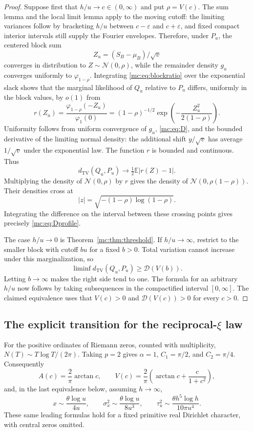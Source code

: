 \begin{proof}
Suppose first that $h/u\to c\in(0,\infty)$ and put $\rho=V(c)$.
The sum lemma and the local limit lemma apply to the moving cutoff:
the limiting variances follow by bracketing $h/u$ between $c-\varepsilon$
and $c+\varepsilon$, and fixed compact interior intervals still supply
the Fourier envelopes.  Therefore, under $P_u$, the centered block sum
\[
 Z_u=(S_B-\mu_B)/\sqrt v
\]
converges in distribution to $Z\sim\mathcal N(0,\rho)$, while the
remainder density $g_u$ converges uniformly to
$\varphi_{1-\rho}$.  Integrating \eqref{mc:eq:blockratio} over the
exponential slack shows that the marginal likelihood of $Q_u$
relative to $P_u$ differs, uniformly in the block values, by $o(1)$
from
\[
 r(Z_u)=\frac{\varphi_{1-\rho}(-Z_u)}{\varphi_1(0)}
       =(1-\rho)^{-1/2}
         \exp\left(-\frac{Z_u^2}{2(1-\rho)}\right).
\]
Uniformity follows from uniform convergence of $g_u$,
\eqref{mc:eq:D}, and the bounded derivative of the limiting normal
density: the additional shift $y/\sqrt v$ has average $1/\sqrt v$
under the exponential law.  The function $r$ is bounded and
continuous.  Thus
\[
 d_{\mathrm{TV}}(Q_u,P_u)
 \longrightarrow\tfrac12\mathbb E|r(Z)-1|.
\]
Multiplying the density of $\mathcal N(0,\rho)$ by $r$ gives the
density of $\mathcal N(0,\rho(1-\rho))$.  Their densities cross at
\[
 |z|=\sqrt{-(1-\rho)\log(1-\rho)}.
\]
Integrating the difference on the interval between these crossing
points gives precisely \eqref{mc:eq:Dprofile}.

The case $h/u\to0$ is Theorem~\ref{mc:thm:threshold}.
If $h/u\to\infty$, restrict to the smaller block with cutoff $bu$
for a fixed $b>0$.  Total variation cannot increase under this
marginalization, so
\[
 \liminf d_{\mathrm{TV}}(Q_u,P_u)\geq\mathcal D(V(b)).
\]
Letting $b\to\infty$ makes the right side tend to one.
The formula for an arbitrary $h/u$ now follows by taking subsequences
in the compactified interval $[0,\infty]$.  The claimed equivalence
uses that $V(c)>0$ and $\mathcal D(V(c))>0$ for every $c>0$.
\end{proof}

\subsection{The explicit transition for the reciprocal-$\xi$ law}

For the positive ordinates of Riemann zeros, counted with multiplicity,
$N(T)\sim T\log T/(2\pi)$.  Taking $p=2$ gives $\alpha=1$,
$C_1=\pi/2$, and $C_2=\pi/4$.  Consequently
\begin{equation}\label{mc:eq:riemannprofiles}
 A(c)=\frac2\pi\arctan c,
 \qquad
 V(c)=\frac2\pi\left(\arctan c+\frac{c}{1+c^2}\right),
\end{equation}
and, in the last equivalence below, assuming $h\to\infty$,
\begin{equation}\label{mc:eq:riemannscales}
 x\sim\frac{\theta\log u}{4u},\qquad
 \sigma_x^2\sim\frac{\theta\log u}{8u^3},\qquad
 \tau_u^2\sim\frac{\theta h^5\log h}{10\pi u^4}.
\end{equation}
These same leading formulas hold for a fixed primitive real Dirichlet
character, with central zeros omitted.

